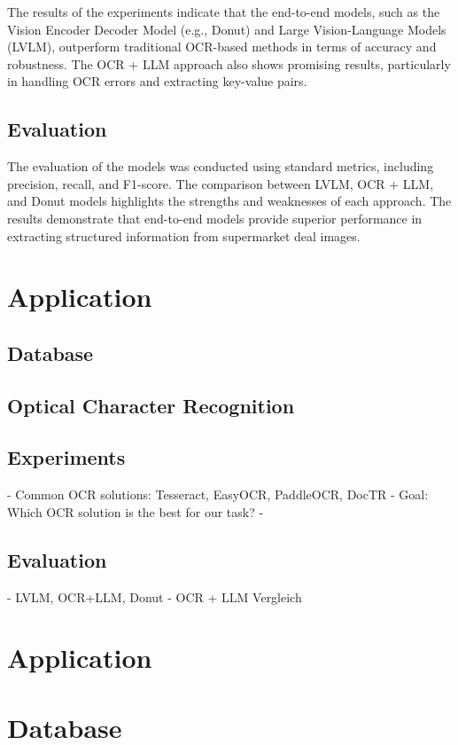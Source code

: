 \documentclass[11pt]{article}
\begin{document}
The results of the experiments indicate that the end-to-end models, such as the Vision Encoder Decoder Model (e.g., Donut) and Large Vision-Language Models (LVLM), outperform traditional OCR-based methods in terms of accuracy and robustness. The OCR + LLM approach also shows promising results, particularly in handling OCR errors and extracting key-value pairs.

\subsection{Evaluation}
The evaluation of the models was conducted using standard metrics, including precision, recall, and F1-score. The comparison between LVLM, OCR + LLM, and Donut models highlights the strengths and weaknesses of each approach. The results demonstrate that end-to-end models provide superior performance in extracting structured information from supermarket deal images.

\section{Application}
\subsection{Database}

    
\subsection{Optical Character Recognition}


    \subsection{Experiments}
    - Common OCR solutions: Tesseract, EasyOCR, PaddleOCR, DocTR
    - Goal: Which OCR solution is the best for our task?
    - 




    \subsection{Evaluation}
    - LVLM, OCR+LLM, Donut
    - OCR + LLM Vergleich

\section{Application}
    \section{Database}
\end{document}

